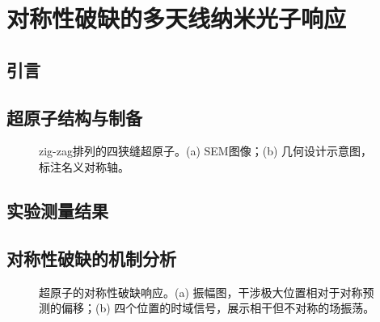 \chapter{对称性破缺的多天线纳米光子响应}
\label{chap:result3}

\section{引言}
\label{sec:r3-intro}


\section{超原子结构与制备}
\label{sec:r3-structure}


\begin{figure}[htbp]
    \centering
    \caption{\label{fig:ch6-meta} zig-zag排列的四狭缝超原子。(a) SEM图像；(b) 几何设计示意图，标注名义对称轴。}
\end{figure}

\section{实验测量结果}
\label{sec:r3-results}


\section{对称性破缺的机制分析}
\label{sec:r3-symmetry}


\begin{figure}[htbp]
    \centering
    \caption{\label{fig:ch6-symmetry} 超原子的对称性破缺响应。(a) 振幅图，干涉极大位置相对于对称预测的偏移；(b) 四个位置的时域信号，展示相干但不对称的场振荡。}
\end{figure}

